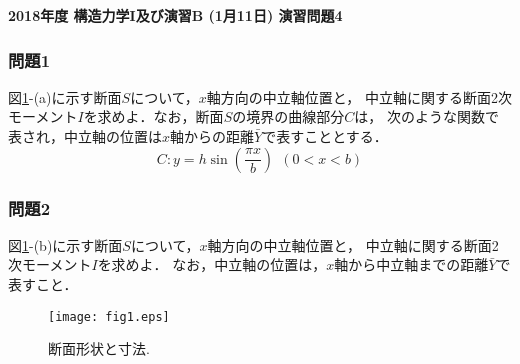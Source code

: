 \documentclass[10pt,a4j]{jarticle}
\newlength{\minitwocolumn}
\begin{document}
\newcommand{\fat}[1]{\mbox{\boldmath $#1$}}
\newcommand{\D}{\partial}
\newcommand{\w}{\omega}
\newcommand{\ga}{\alpha}
\newcommand{\gb}{\beta}
\newcommand{\gx}{\xi}
\newcommand{\gz}{\zeta}
\newcommand{\vhat}[1]{\hat{\fat{#1}}}
\newcommand{\spc}{\vspace{0.7\baselineskip}}
\newcommand{\halfspc}{\vspace{0.3\baselineskip}}

\pagestyle{empty}
\newcommand{\twofig}[2]
 {
   \begin{figure}[h]
     \begin{minipage}[t]{\minitwocolumn}
         \begin{center}   #1
         \end{center}
     \end{minipage}
         \hspace{\columnsep}
     \begin{minipage}[t]{\minitwocolumn}
         \begin{center} #2
         \end{center}
     \end{minipage}
   \end{figure}
 }
\begin{center}
{\Large \bf 2018年度 構造力学I及び演習B (1月11日) 演習問題4} \\
\end{center}
\subsubsection*{問題1}
図\ref{fig:fig1}-(a)に示す断面$S$について，$x$軸方向の中立軸位置と，
中立軸に関する断面2次モーメント$I$を求めよ．なお，断面$S$の境界の曲線部分$C$は，
次のような関数で表され，中立軸の位置は$x$軸からの距離$\bar{Y}$で表すこととする．
\begin{equation}
	C: y=h \sin \left( \frac{\pi x}{b}\right) 
	\ \ \left(0 < x < b \right)
\end{equation}
\subsubsection*{問題2}
図\ref{fig:fig1}-(b)に示す断面$S$について，$x$軸方向の中立軸位置と，
中立軸に関する断面2次モーメント$I$を求めよ．
なお，中立軸の位置は，$x$軸から中立軸までの距離$\bar{Y}$で表すこと．
\vspace{15mm}
\begin{figure}[h]
	\begin{center}
	\texttt{[image: fig1.eps]} 
	\end{center}
	\caption{断面形状と寸法.} 
	\label{fig:fig1}
\end{figure}
\end{document}
